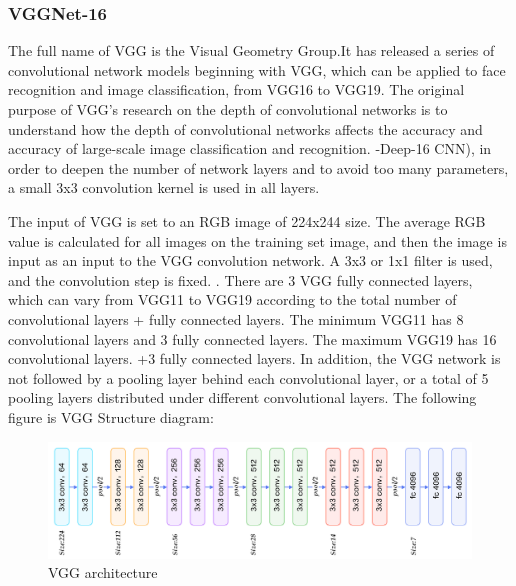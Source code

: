 \documentclass[a4paper,12pt]{report}
\begin{document}
\subsubsection{VGGNet-16}
The full name of VGG is the Visual Geometry Group.It has released a series of convolutional network models beginning with VGG, which can be applied to face recognition and image classification, from VGG16 to VGG19. The original purpose of VGG's research on the depth of convolutional networks is to understand how the depth of convolutional networks affects the accuracy and accuracy of large-scale image classification and recognition. -Deep-16 CNN), in order to deepen the number of network layers and to avoid too many parameters, a small 3x3 convolution kernel is used in all layers.

The input of VGG is set to an RGB image of 224x244 size. The average RGB value is calculated for all images on the training set image, and then the image is input as an input to the VGG convolution network. A 3x3 or 1x1 filter is used, and the convolution step is fixed. . There are 3 VGG fully connected layers, which can vary from VGG11 to VGG19 according to the total number of convolutional layers + fully connected layers. The minimum VGG11 has 8 convolutional layers and 3 fully connected layers. The maximum VGG19 has 16 convolutional layers. +3 fully connected layers. In addition, the VGG network is not followed by a pooling layer behind each convolutional layer, or a total of 5 pooling layers distributed under different convolutional layers. The following figure is VGG Structure diagram:

  \begin{figure}[h] %
   \begin{center}
   \includegraphics[scale=0.2]{vgg.png}
   \caption{VGG architecture}
  \end{center}
  \end{figure}
  
\end{document}
